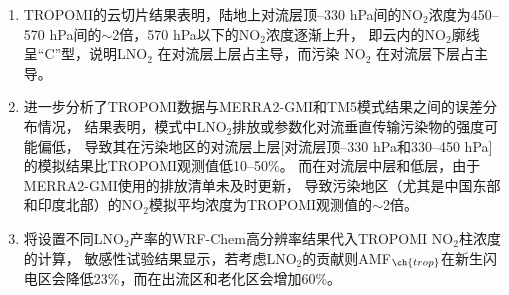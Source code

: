\begin{enumerate}[label=（\arabic*）, labelindent=\parindent, nosep, leftmargin=0pt, widest=0, itemindent=*, topsep=0pt, partopsep=0pt, parsep=0pt]

\item TROPOMI的云切片结果表明，陆地上对流层顶--330 hPa间的NO$_2$浓度为450--570 hPa间的$\sim$2倍，570 hPa以下的NO$_2$浓度逐渐上升，
即云内的NO$_2$廓线呈“C”型，说明LNO$_2$ 在对流层上层占主导，而污染 NO$_2$ 在对流层下层占主导。

\item 进一步分析了TROPOMI数据与MERRA2-GMI和TM5模式结果之间的误差分布情况，
结果表明，模式中LNO$_2$排放或参数化对流垂直传输污染物的强度可能偏低，
导致其在污染地区的对流层上层[对流层顶--330 hPa和330--450 hPa]的模拟结果比TROPOMI观测值低10--50\%。
而在对流层中层和低层，由于MERRA2-GMI使用的排放清单未及时更新，
导致污染地区（尤其是中国东部和印度北部）的NO$_2$模拟平均浓度为TROPOMI观测值的$\sim$2倍。

\item 将设置不同LNO$_2$产率的WRF-Chem高分辨率结果代入TROPOMI NO$_2$柱浓度的计算，
敏感性试验结果显示，若考虑LNO$_2$的贡献则AMF$_{\ch{trop}}$在新生闪电区会降低23\%，而在出流区和老化区会增加60\%。

\end{enumerate}
